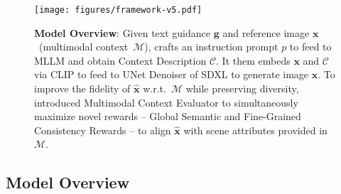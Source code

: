 \begin{figure}[!t]
    \centering
    \texttt{[image: figures/framework-v5.pdf]}
    \vspace{-8mm}
    \caption{\textbf{Model Overview}: Given text guidance $\mathbf{g}$ and reference image $\mathbf{x}$~(multimodal context~$\mathcal{M}$), \method crafts an instruction prompt $p$ to feed to MLLM and obtain Context Description $\mathcal{C}$. It them embeds $\mathbf{x}$ and $\mathcal{C}$ via CLIP to feed to UNet Denoiser of SDXL to generate image $\mathbf{\hat{x}}$. To improve the fidelity of $\mathbf{\hat{x}}$ w.r.t.~$\mathcal{M}$ while preserving diversity, \method introduced Multimodal Context Evaluator to simultaneously maximize novel rewards -- Global Semantic and Fine-Grained Consistency Rewards -- to align $\mathbf{\hat{x}}$ with scene attributes provided in $\mathcal{M}$.}
    \label{fig:overview}
    \vspace{-5mm}
\end{figure}



\subsection{Model Overview}




